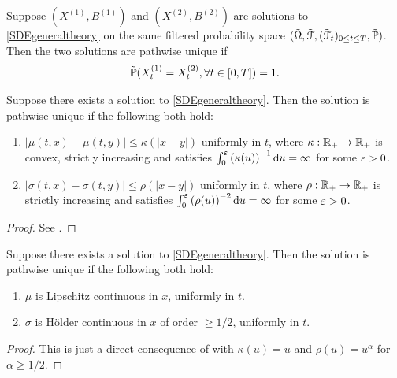 \begin{definition}
\label{def:pathwiseunique}
Suppose $(X^{(1)}, B^{(1)})$ and $(X^{(2)}, B^{(2)})$ are solutions to \cref{SDEgeneraltheory} on the same filtered probability space $(\tilde \Omega, \tilde {\mathcal{F}}, (\tilde {\mathcal{F}}_t)_{0 \leq t \leq T}, \tilde {\mathbb{P}})$. Then the two solutions are pathwise unique if
\begin{align*}
	\tilde {\mathbb{P}}( X^{(1)}_t = X^{(2)}_t, \forall t \in[0,T] ) = 1.
\end{align*}
\end{definition}
\begin{theorem}
\label{thm:pathwiseunique}
Suppose there exists a solution to \cref{SDEgeneraltheory}. Then the solution is pathwise unique if the following both hold:
\begin{enumerate}
\item $|\mu(t,x) - \mu(t,y) | \leq \kappa(|x-y|)$ uniformly in $t$, where $\kappa: \mathbb{R}_+ \to \mathbb{R}_+$ is convex, strictly increasing and satisfies $\int_0^{\varepsilon} \left (\kappa(u) \right )^{-1} \mathrm {d} u = \infty$ for some $\varepsilon >0$.
\item $|\sigma(t,x) - \sigma(t,y) | \leq \rho(|x-y|)$ uniformly in $t$, where $\rho: \mathbb{R}_+ \to \mathbb{R}_+$ is strictly increasing and satisfies $ \int_0^{\varepsilon}  \left (\rho(u) \right )^{-2} \mathrm {d} u = \infty$ for some $\varepsilon>0$.
\end{enumerate}
\end{theorem}
\begin{proof}
See \citet{yamada1971uniqueness}.
\end{proof}
\begin{corollary}
\label{cor:pathwiseunique}
Suppose there exists a solution to \cref{SDEgeneraltheory}. Then the solution is pathwise unique if the following both hold:
\begin{enumerate}
\item $\mu$ is Lipschitz continuous in $x$, uniformly in $t$.
\item $\sigma$ is H\"older continuous in $x$ of order $\geq 1/2$, uniformly in $t$.
\end{enumerate}
\end{corollary}
\begin{proof}
This is just a direct consequence of  with $\kappa(u) = u$ and $\rho(u) = u^{\alpha}$ for $\alpha \geq 1/2$. 
\end{proof}

